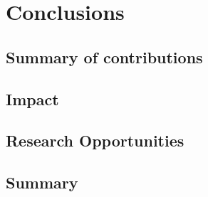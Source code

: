 \chapter{Conclusions}


\section{Summary of contributions}


\section{Impact}


\section{Research Opportunities}


\section{Summary}
